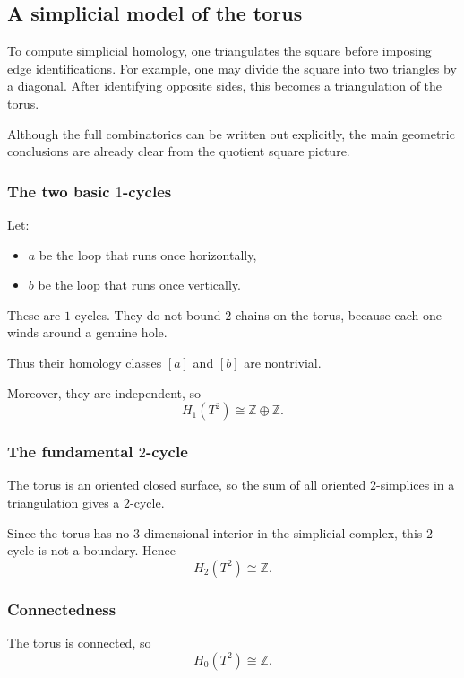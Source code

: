 \documentclass[12pt,a4paper]{article}
\theoremstyle{notespace}
\begin{document}
\subsection{A simplicial model of the torus}

To compute simplicial homology, one triangulates the square before imposing edge identifications. For example, one may divide the square into two triangles by a diagonal. After identifying opposite sides, this becomes a triangulation of the torus.

Although the full combinatorics can be written out explicitly, the main geometric conclusions are already clear from the quotient square picture.

\subsubsection{The two basic \texorpdfstring{$1$}{1}-cycles}

Let:
\begin{itemize}
	\item \(a\) be the loop that runs once horizontally,
	\item \(b\) be the loop that runs once vertically.
\end{itemize}

These are \(1\)-cycles. They do not bound \(2\)-chains on the torus, because each one winds around a genuine hole.

Thus their homology classes \([a]\) and \([b]\) are nontrivial.

Moreover, they are independent, so
\[
H_1(T^2)\cong \mathbb{Z}\oplus \mathbb{Z}.
\]

\subsubsection{The fundamental \texorpdfstring{$2$}{2}-cycle}

The torus is an oriented closed surface, so the sum of all oriented \(2\)-simplices in a triangulation gives a \(2\)-cycle.

Since the torus has no \(3\)-dimensional interior in the simplicial complex, this \(2\)-cycle is not a boundary. Hence
\[
H_2(T^2)\cong \mathbb{Z}.
\]

\subsubsection{Connectedness}

The torus is connected, so
\[
H_0(T^2)\cong \mathbb{Z}.
\]
\end{document}
